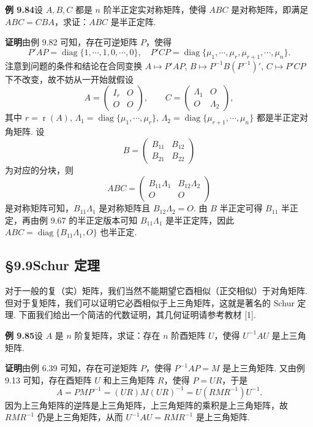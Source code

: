 \documentclass[UTF8,12pt,a4paper,fontset=fandol]{ctexart}
\begin{document}
\noindent\textbf{例 9.84}\quad 设 $A,B,C$ 都是 $n$ 阶半正定实对称矩阵，使得 $ABC$ 是对称矩阵，即满足 $ABC=CBA$，求证：$ABC$ 是半正定阵.

\noindent\textbf{证明}\quad 由例 9.82 可知，存在可逆矩阵 $P$，使得
\[
P'AP=\operatorname{diag}\{1,\cdots,1,0,\cdots,0\},\quad
P'CP=\operatorname{diag}\{\mu_1,\cdots,\mu_r,\mu_{r+1},\cdots,\mu_n\}.
\]
注意到问题的条件和结论在合同变换 $A\mapsto P'AP$, $B\mapsto P^{-1}B(P^{-1})'$, $C\mapsto P'CP$ 下不改变，故不妨从一开始就假设
\[
A=\begin{pmatrix}I_r&O\\O&O\end{pmatrix},\qquad
C=\begin{pmatrix}\Lambda_1&O\\O&\Lambda_2\end{pmatrix},
\]
其中 $r=\operatorname{r}(A)$, $\Lambda_1=\operatorname{diag}\{\mu_1,\cdots,\mu_r\}$, $\Lambda_2=\operatorname{diag}\{\mu_{r+1},\cdots,\mu_n\}$ 都是半正定对角矩阵. 设
\[
B=\begin{pmatrix}
B_{11}&B_{12}\\
B_{21}&B_{22}
\end{pmatrix}
\]
为对应的分块，则
\[
ABC=\begin{pmatrix}
B_{11}\Lambda_1&B_{12}\Lambda_2\\
O&O
\end{pmatrix}
\]
是对称矩阵可知，$B_{11}\Lambda_1$ 是对称矩阵且 $B_{12}\Lambda_2=O$. 由 $B$ 半正定可得 $B_{11}$ 半正定，再由例 9.67 的半正定版本可知 $B_{11}\Lambda_1$ 是半正定阵，因此 $ABC=\operatorname{diag}\{B_{11}\Lambda_1,O\}$ 也半正定.

\subsection*{§9.9\quad Schur 定理}

对于一般的复（实）矩阵，我们当然不能期望它酉相似（正交相似）于对角矩阵. 但对于复矩阵，我们可以证明它必酉相似于上三角矩阵，这就是著名的 Schur 定理. 下面我们给出一个简洁的代数证明，其几何证明请参考教材 [1].

\noindent\textbf{例 9.85}\quad 设 $A$ 是 $n$ 阶复矩阵，求证：存在 $n$ 阶酉矩阵 $U$，使得 $U^{-1}AU$ 是上三角矩阵.

\noindent\textbf{证明}\quad 由例 6.39 可知，存在可逆矩阵 $P$，使得 $P^{-1}AP=M$ 是上三角矩阵. 又由例 9.13 可知，存在酉矩阵 $U$ 和上三角矩阵 $R$，使得 $P=UR$，于是
\[
A=PMP^{-1}=(UR)M(UR)^{-1}=U(RMR^{-1})U^{-1}.
\]
因为上三角矩阵的逆阵是上三角矩阵，上三角矩阵的乘积是上三角矩阵，故 $RMR^{-1}$ 仍是上三角矩阵，从而 $U^{-1}AU=RMR^{-1}$ 是上三角矩阵.
\end{document}
